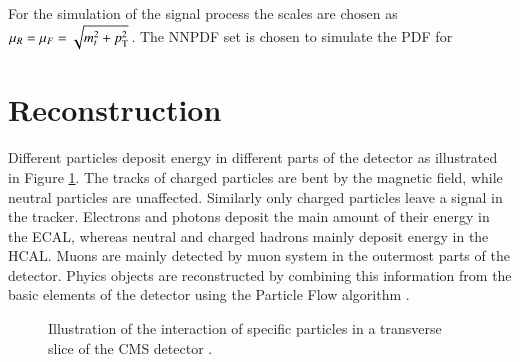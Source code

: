 For the simulation of the \ttbar signal process the scales are chosen as $\mu_R = \mu_F = \sqrt{m_t^2 + p_{\mathrm{T}}^2}$.
The NNPDF set is chosen to simulate the PDF for 






\section{Reconstruction}
\label{sec:SimReco_Reco}

Different particles deposit energy in different parts of the detector as illustrated in Figure \ref{fig:pflow}.
The tracks of charged particles are bent by the magnetic field, while neutral particles are unaffected.
Similarly only charged particles leave a signal in the tracker.
Electrons and photons deposit the main amount of their energy in the ECAL, whereas neutral and charged hadrons mainly deposit energy in the HCAL.
Muons are mainly detected by muon system in the outermost parts of the detector.
Phyics objects are reconstructed by combining this information from the basic elements of the detector using the Particle Flow algorithm \cite{Sirunyan:2017ulk}.

\begin{figure}[htbp!]
  \begin{center}
\caption{Illustration of the interaction of specific particles in a transverse slice of the CMS detector \cite{Sirunyan:2017ulk}.
  \label{fig:pflow}}
  \end{center}
\end{figure}

